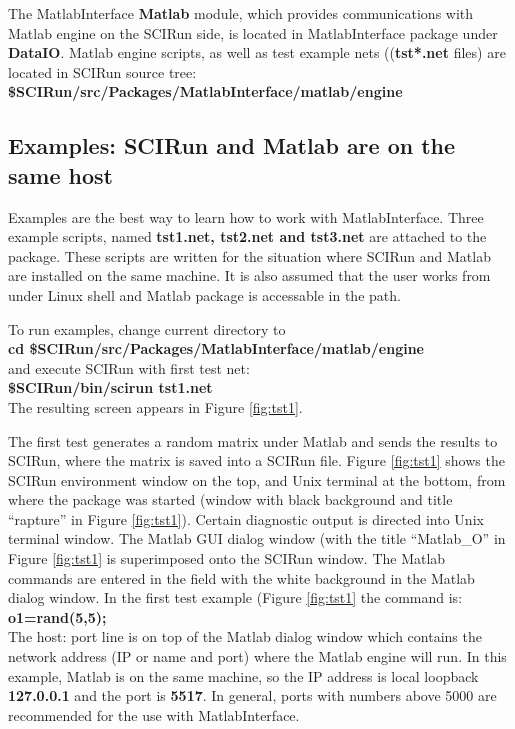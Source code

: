 \documentclass[12pt]{IEEEtran}
\newcommand{\sr}{SCIRun}
\begin{document}
The MatlabInterface {\bf Matlab} module, which provides communications with 
Matlab engine on the \sr{} side, is located in MatlabInterface 
package under {\bf DataIO}. Matlab engine scripts, as well as test 
example nets (({\bf tst*.net} files) are located in SCIRun source tree: \\
{\bf \$SCIRun/src/Packages/MatlabInterface/matlab/engine }\\

\subsection*{Examples: SCIRun and Matlab are on the same host} \indent

Examples are the best way to learn how to work with MatlabInterface.
Three example scripts, named {\bf tst1.net, tst2.net and tst3.net}
are attached to the package.
These scripts are written for the situation where SCIRun and 
Matlab are installed on the same machine. 
It is also assumed that the user works from under Linux
shell and Matlab package is accessable in the path. 

To run examples, change current directory to \\
{\bf cd \$SCIRun/src/Packages/MatlabInterface/matlab/engine } \\
and execute SCIRun with first test net: \\
{\bf \$SCIRun/bin/scirun  tst1.net} \\
The resulting screen appears in Figure \ref{fig:tst1}.

The first test generates a random matrix under Matlab and sends the
results to \sr{}, where the matrix is saved into a \sr{} file. 
Figure \ref{fig:tst1} shows the SCIRun environment window on the top,
and Unix terminal at the bottom, from where the package was started
(window with black background and title ``rapture'' in Figure 
\ref{fig:tst1}).  Certain diagnostic output is directed into Unix 
terminal window. 
The Matlab GUI dialog window (with the title
``Matlab\_O'' in Figure \ref{fig:tst1} is superimposed onto the \sr{}
window. The Matlab commands are entered in the field with the white
background in the Matlab dialog window.
In the first test example (Figure \ref{fig:tst1}
the command is: \\
{\bf o1=rand(5,5);} \\

The host:
port line is on top of the Matlab dialog window which
contains the network address (IP or name and port) where the Matlab 
engine will run. In this example, Matlab is on the same
machine, so the IP address is local loopback {\bf 127.0.0.1} and 
the port is {\bf 5517}. In general, ports with numbers above 5000
are recommended for the use with MatlabInterface. 
\end{document}

